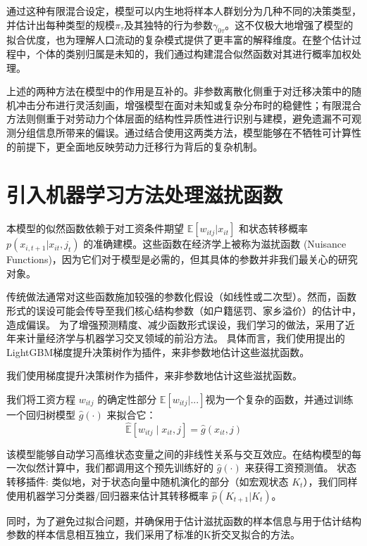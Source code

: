 \documentclass[
  a4paper,
  zihao=-4,
  fontset=mac,
  AutoFakeBold,
  AutoFakeSlant,
  oneside]{ctexbook}
\begin{document}
通过这种有限混合设定，模型可以内生地将样本人群划分为几种不同的决策类型，并估计出每种类型的规模$\pi_\tau$及其独特的行为参数$\gamma_{0\tau}$。这不仅极大地增强了模型的拟合优度，也为理解人口流动的复杂模式提供了更丰富的解释维度。在整个估计过程中，个体的类别归属是未知的，我们通过构建混合似然函数对其进行概率加权处理。

上述的两种方法在模型中的作用是互补的。非参数离散化侧重于对迁移决策中的随机冲击分布进行灵活刻画，增强模型在面对未知或复杂分布时的稳健性；有限混合方法则侧重于对劳动力个体层面的结构性异质性进行识别与建模，避免遗漏不可观测分组信息所带来的偏误。通过结合使用这两类方法，模型能够在不牺牲可计算性的前提下，更全面地反映劳动力迁移行为背后的复杂机制。


\section{引入机器学习方法处理滋扰函数} 
\label{sec:ml_plugins}



本模型的似然函数依赖于对工资条件期望 $\mathbb{E}[w_{itj} | x_{it}]$ 和状态转移概率 $p(x_{i,t+1} | x_{it}, j_t)$ 的准确建模。这些函数在经济学上被称为滋扰函数 (Nuisance Functions)，因为它们对于模型是必需的，但其具体的参数并非我们最关心的研究对象。

传统做法通常对这些函数施加较强的参数化假设（如线性或二次型）。然而，函数形式的误设可能会传导至我们核心结构参数（如户籍惩罚、家乡溢价）的估计中，造成偏误。
为了增强预测精度、减少函数形式误设，我们学习\textcite{atheyGeneralizedRandomForests2019}的做法，采用了近年来计量经济学与机器学习交叉领域的前沿方法。
具体而言，我们使用\textcite{keLightGBMHighlyEfficient2017}提出的LightGBM梯度提升决策树作为插件，来非参数地估计这些滋扰函数。

我们使用梯度提升决策树作为插件，来非参数地估计这些滋扰函数。


我们将工资方程 $w_{itj}$ 的确定性部分 $\mathbb{E}[w_{itj} | ...] $视为一个复杂的函数，并通过训练一个回归树模型 $\hat{g}(\cdot)$ 来拟合它：
\begin{equation}
\hat{\mathbb{E}}[w_{itj} \mid x_{it}, j] = \hat{g}(x_{it}, j)
\end{equation}

该模型能够自动学习高维状态变量之间的非线性关系与交互效应。在结构模型的每一次似然计算中，我们都调用这个预先训练好的 $\hat{g}(\cdot)$ 来获得工资预测值。
状态转移插件: 类似地，对于状态向量中随机演化的部分（如宏观状态 $K_t$），我们同样使用机器学习分类器/回归器来估计其转移概率 $\hat{p}(K_{t+1} | K_t)$。

同时，为了避免过拟合问题，并确保用于估计滋扰函数的样本信息与用于估计结构参数的样本信息相互独立，我们采用了标准的K折交叉拟合的方法。
\end{document}
